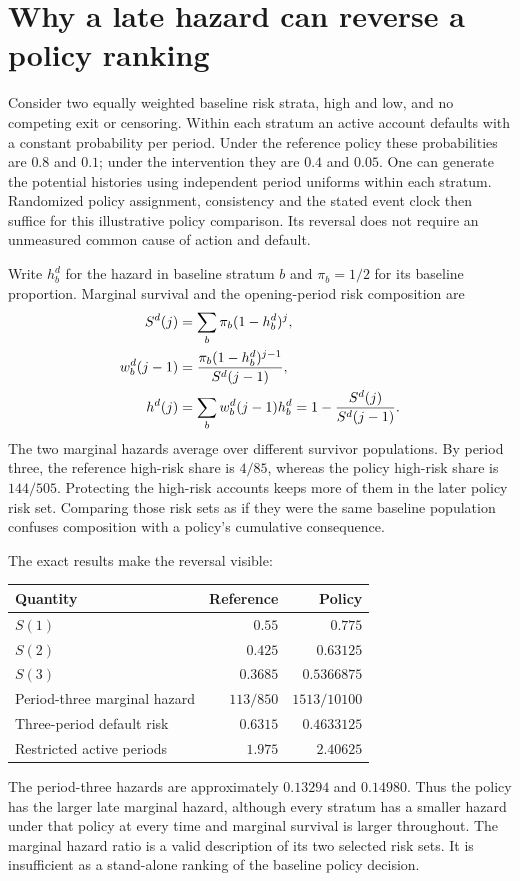 \section{Why a late hazard can reverse a policy ranking}
\label{exec17:s5-selection}

Consider two equally weighted baseline risk strata, high and low, and no
competing exit or censoring. Within each stratum an active account defaults
with a constant probability per period. Under the reference policy these
probabilities are $0.8$ and $0.1$; under the intervention they are $0.4$ and
$0.05$. One can generate the potential histories using independent period
uniforms within each stratum. Randomized policy assignment, consistency and
the stated event clock then suffice for this illustrative policy comparison.
Its reversal does not require an unmeasured common cause of action and default.

Write $h_b^d$ for the hazard in baseline stratum $b$ and $\pi_b=1/2$ for its
baseline proportion. Marginal survival and the opening-period risk composition
are
\begin{align}
 S^d(j)&=\sum_b\pi_b(1-h_b^d)^j,\notag\\
 w_b^d(j-1)&=\frac{\pi_b(1-h_b^d)^{j-1}}{S^d(j-1)},\notag\\
 h^d(j)&=\sum_bw_b^d(j-1)h_b^d
        =1-\frac{S^d(j)}{S^d(j-1)}.
 \label{exec17:s5-mixture-hazard}
\end{align}
The two marginal hazards average over different survivor populations. By
period three, the reference high-risk share is $4/85$, whereas the policy
high-risk share is $144/505$. Protecting the high-risk accounts keeps more of
them in the later policy risk set. Comparing those risk sets as if they were
the same baseline population confuses composition with a policy's cumulative
consequence.

The exact results make the reversal visible:
\begin{center}
\begin{tabular}{lrr}
\hline
Quantity & Reference & Policy\\
\hline
$S(1)$ & $0.55$ & $0.775$\\
$S(2)$ & $0.425$ & $0.63125$\\
$S(3)$ & $0.3685$ & $0.5366875$\\
Period-three marginal hazard & $113/850$ & $1513/10100$\\
Three-period default risk & $0.6315$ & $0.4633125$\\
Restricted active periods & $1.975$ & $2.40625$\\
\hline
\end{tabular}
\end{center}
The period-three hazards are approximately $0.13294$ and $0.14980$. Thus the
policy has the larger late marginal hazard, although every stratum has a
smaller hazard under that policy at every time and marginal survival is larger
throughout. The marginal hazard ratio is a valid description of its two
selected risk sets. It is insufficient as a stand-alone ranking of the
baseline policy decision.

